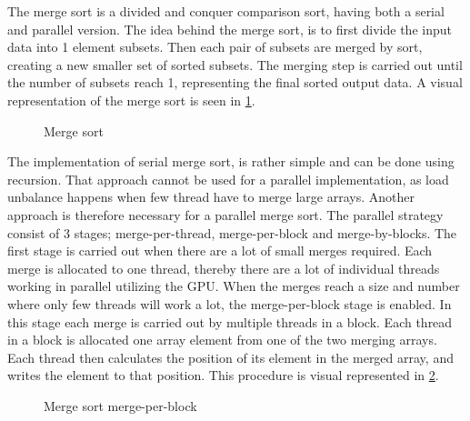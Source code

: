The merge sort is a divided and conquer comparison sort, having both a serial and parallel version. The idea behind the merge sort, is to first divide the input data into 1 element subsets. Then each pair of subsets are merged by sort, creating a new smaller set of sorted subsets. The merging step is carried out until the number of subsets reach 1, representing the final sorted output data. A visual representation of the merge sort is seen in \cref{fig:sort_merge}.

\begin{figure}[ht]
	\centering
	\caption{Merge sort}
	\label{fig:sort_merge}
\end{figure}  

The implementation of serial merge sort, is rather simple and can be done using recursion. That approach cannot be used for a parallel implementation, as load unbalance happens when few thread have to merge large arrays. Another approach is therefore necessary for a parallel merge sort. The parallel strategy consist of 3 stages; merge-per-thread, merge-per-block and merge-by-blocks. The first stage is carried out when there are a lot of small merges required. Each merge is allocated to one thread, thereby there are a lot of individual threads working in parallel utilizing the GPU. When the merges reach a size and number where only few threads will work a lot, the merge-per-block stage is enabled. In this stage each merge is carried out by multiple threads in a block. Each thread in a block is allocated one array element from one of the two merging arrays. Each thread then calculates the position of its element in the merged array, and writes the element to that position. This procedure is visual represented in \cref{fig:sort_merge_per_block}.     

\begin{figure}[ht]
	\centering
	\caption{Merge sort merge-per-block}
	\label{fig:sort_merge_per_block}
\end{figure}  

